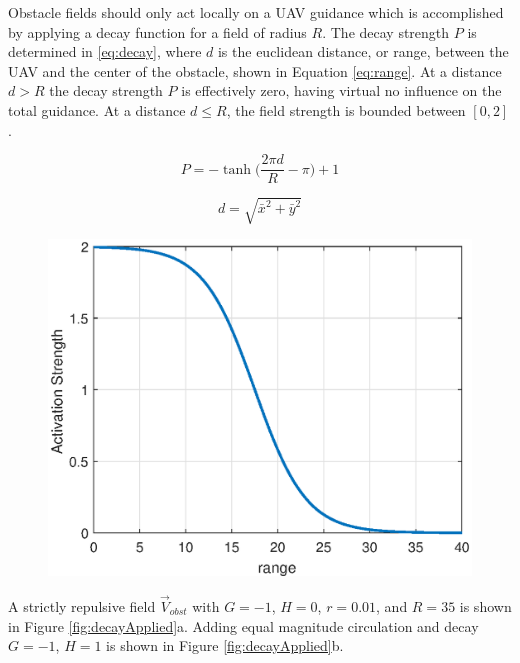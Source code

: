 \documentclass[numbered,pdftex]{ohio-etd}
\begin{document}
Obstacle fields should only act locally on a UAV guidance which is accomplished by applying a decay function for a field of radius $R$. The decay strength $P$ is determined in \ref{eq:decay}, where $d$ is the euclidean distance, or range, between the UAV and the center of the obstacle, shown in Equation \ref{eq:range}. At a distance $d>R$ the decay strength $P$ is effectively zero, having virtual no influence on the total guidance. At a distance $d\leq R$, the field strength is bounded between $[0,2]$.


\begin{equation}
\label{eq:decay}
P = -\tanh \bigg( \frac{2\pi d}{R}-\pi\bigg)+1
\end{equation}

\begin{equation}
\label{eq:range}
d = \sqrt{ \bar{x}^2+\bar{y}^2}
\end{equation}

\begin{figure}[H]
	\centering
	\includegraphics[width=0.7\linewidth]{Figures/methods/tanH}
	\caption{}
	\label{fig:tanh}
\end{figure}


A strictly repulsive field $\overrightarrow{V}_{obst}$ with $G=-1$, $H=0$, $r=0.01$, and $R = 35$ is shown in Figure \ref{fig:decayApplied}a. Adding equal magnitude circulation and decay $G=-1$, $H=1$ is shown in Figure \ref{fig:decayApplied}b.
\end{document}
